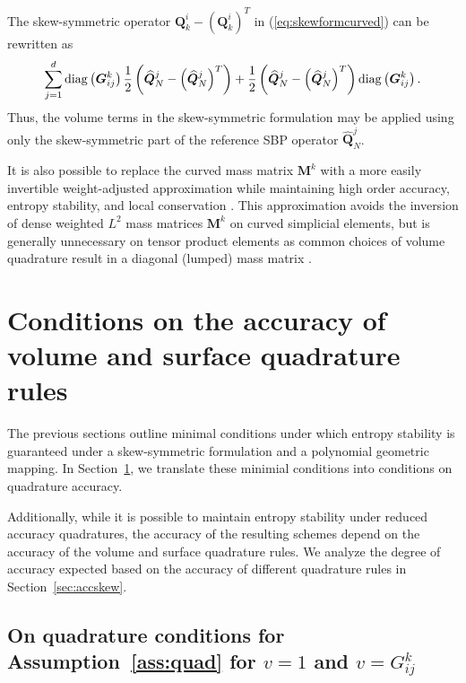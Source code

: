 \documentclass{svjour3}                     %
\renewcommand{\hat}{\widehat}
\newcommand{\diag}[1]{{\rm diag}\LRp{#1}}
\newcommand{\LRp}[1]{\left( #1 \right)}
\begin{document}
\begin{remark}
The skew-symmetric operator ${\bm{Q}^i_k - \LRp{\bm{Q}^i_k}^T}$ in (\ref{eq:skewformcurved}) can be rewritten as
\begin{align*}
\sum_{j=1}^d \diag{\bm{G}^k_{ij}}{ \frac{1}{2}\LRp{\hat{\bm{Q}}_N^j-\LRp{\hat{\bm{Q}}_N^j}^T}}+  \frac{1}{2} \LRp{\hat{\bm{Q}}_N^j-\LRp{\hat{\bm{Q}}_N^j}^T}\diag{\bm{G}^k_{ij}}.
\end{align*}
Thus, the volume terms in the skew-symmetric formulation may be applied using only the skew-symmetric part of the reference SBP operator $\hat{\bm{Q}}^j_N$.
\end{remark}

\begin{remark}
It is also possible to replace the curved mass matrix $\bm{M}^k$ with a more easily invertible weight-adjusted approximation while maintaining high order accuracy, entropy stability, and local conservation \cite{chan2018discretely}.  This approximation avoids the inversion of dense weighted $L^2$ mass matrices $\bm{M}^k$ on curved simplicial elements, but is generally unnecessary on tensor product elements as common choices of volume quadrature result in a diagonal (lumped) mass matrix \cite{carpenter2014entropy, parsani2016entropy, chan2018efficient}.
\end{remark}

\section{Conditions on the accuracy of volume and surface quadrature rules}
\label{sec:quadacc}

The previous sections outline minimal conditions under which entropy stability is guaranteed under a skew-symmetric formulation and a polynomial geometric mapping.  In Section~\ref{sec:quadacc}, we translate these minimial conditions into conditions on quadrature accuracy.  

Additionally, while it is possible to maintain entropy stability under reduced accuracy quadratures, the accuracy of the resulting schemes depend on the accuracy of the volume and surface quadrature rules.  We analyze the degree of accuracy expected based on the accuracy of different quadrature rules in Section~\ref{sec:accskew}.  

\subsection{On quadrature conditions for Assumption~\ref{ass:quad} for $v = 1$ and $v = G^k_{ij}$}
\end{document}
